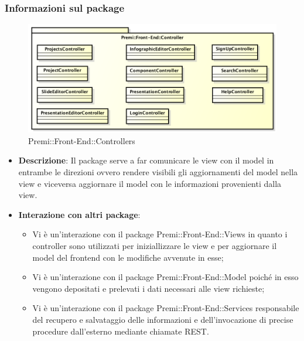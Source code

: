 \subsubsection*{Informazioni sul package}
\begin{figure}[h]
	\centering
	\includegraphics[width=1.0\linewidth]{img/front-end_controller}
	\caption[Premi::Front-End::Controllers]{Premi::Front-End::Controllers}
\end{figure}
\begin{itemize}
	\item \textbf{Descrizione}: Il package serve a far comunicare le view con il model in entrambe le direzioni ovvero rendere visibili gli aggiornamenti del model nella view e viceversa aggiornare il model con le informazioni provenienti dalla view.
	\item \textbf{Interazione con altri package}:
	\begin{itemize}
		\item Vi è un'interazione con il package Premi::Front-End::Views in quanto i controller sono utilizzati per iniziallizzare le view e per aggiornare il model del frontend con le modifiche avvenute in esse;
		\item Vi è un'interazione con il package Premi::Front-End::Model poiché in esso vengono depositati e prelevati i dati necessari alle view richieste;
		\item Vi è un'interazione con il package Premi::Front-End::Services responsabile del recupero e salvataggio delle informazioni e dell'invocazione di precise procedure dall'esterno mediante chiamate REST.
	\end{itemize}

\end{itemize}

